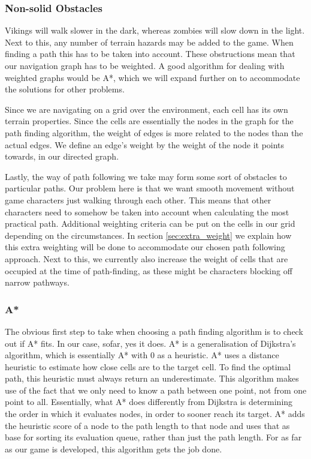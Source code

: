 \subsubsection{Non-solid Obstacles}
Vikings will walk slower in the dark, whereas zombies will slow down in the light. Next to this, any number of terrain hazards may be added to the game. When finding a path this has to be taken into account. These obstructions mean that our navigation graph has to be weighted. A good algorithm for dealing with weighted graphs would be A*, which we will expand further on to accommodate the solutions for other problems.

Since we are navigating on a grid over the environment, each cell has its own terrain properties. Since the cells are essentially the nodes in the graph for the path finding algorithm, the weight of edges is more related to the nodes than the actual edges. We define an edge's weight by the weight of the node it points towards, in our directed graph. 

Lastly, the way of path following we take may form some sort of obstacles to particular paths. Our problem here is that we want smooth movement without game characters just walking through each other. This means that other characters need to somehow be taken into account when calculating the most practical path. Additional weighting criteria can be put on the cells in our grid depending on the circumstances. In section \ref{sec:extra_weight} we explain how this extra weighting will be done to accommodate our chosen path following approach. Next to this, we currently also increase the weight of cells that are occupied at the time of path-finding, as these might be characters blocking off narrow pathways.

\subsubsection{A*}
The obvious first step to take when choosing a path finding algorithm is to check out if A* fits. In our case, sofar, yes it does. A* is a generalisation of Dijkstra's algorithm, which is essentially A* with $0$ as a heuristic. A* uses a distance heuristic to estimate how close cells are to the target cell. To find the optimal path, this heuristic must always return an underestimate. This algorithm makes use of the fact that we only need to know a path between one point, not from one point to all. Essentially, what A* does differently from Dijkstra is determining the order in which it evaluates nodes, in order to sooner reach its target. A* adds the heuristic score of a node to the path length to that node and uses that as base for sorting its evaluation queue, rather than just the path length. For as far as our game is developed, this algorithm gets the job done.

